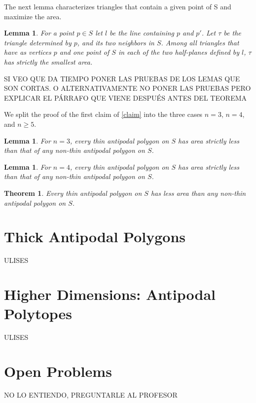 \documentclass[twoside]{article}
\newtheorem{lem}[defin]{Lemma}
\newtheorem{thm}[defin]{Theorem}
\begin{document}
The next lemma characterizes triangles that contain a given point of S and maximize
the area.

\begin{lem}
For a point $p ∈ S$ let $l$ be the line containing $p$ and $p'$. Let $τ$ be the triangle
determined by $p$, and its two neighbors in $S$. Among all triangles that have as vertices
$p$ and one point of $S$ in each of the two half-planes defined by $l$, $τ$ has strictly the
smallest area.
\end{lem}

SI VEO QUE DA TIEMPO PONER LAS PRUEBAS DE LOS LEMAS QUE SON CORTAS. O ALTERNATIVAMENTE NO PONER LAS PRUEBAS PERO EXPLICAR EL PÁRRAFO QUE VIENE DESPUÉS ANTES DEL TEOREMA

We split the proof of the first claim of \ref{claim} into the three cases $n = 3$, $n = 4$, and $n ≥ 5$.

\begin{lem}
For $n = 3$, every thin antipodal polygon on $S$ has area strictly less than
that of any non-thin antipodal polygon on $S$.
\end{lem}

\begin{lem}
For $n = 4$, every thin antipodal polygon on $S$ has area strictly less than
that of any non-thin antipodal polygon on $S$.
\end{lem}

\begin{thm}
Every thin antipodal polygon on $S$ has less area than any non-thin antipodal
polygon on $S$.
\end{thm}


\section{Thick Antipodal Polygons}
ULISES

\section{Higher Dimensions: Antipodal Polytopes}
ULISES


 \section{Open Problems}
 NO LO ENTIENDO, PREGUNTARLE AL PROFESOR
\end{document}
